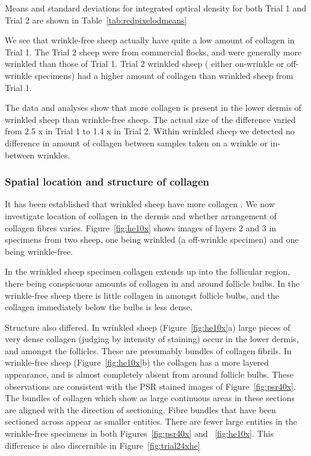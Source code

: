 \documentclass[]{interact}
\theoremstyle{plain}%
\theoremstyle{definition}
\theoremstyle{remark}
\begin{document}
Means and standard deviations for integrated optical density for both Trial 1 and Trial 2 are shown in Table~\ref{tab:redpixelodmeans}

We see that wrinkle-free sheep actually have quite a low amount of collagen in Trial 1. 
The Trial 2 sheep were from commercial flocks, and were generally more wrinkled than those of Trial 1.  Trial 2  wrinkled sheep ( either on-wrinkle or  off-wrinkle specimens) had a higher amount of collagen than wrinkled sheep from Trial 1. 

The data and analyses show that more collagen is present in the lower dermis of wrinkled sheep than wrinkle-free sheep.  The actual size of the difference varied from 2.5 x in Trial 1 to 1.4 x in Trial 2. 
Within wrinkled sheep we detected no difference in amount of collagen between samples taken on a wrinkle or in-between wrinkles.


\subsubsection{Spatial location and structure of collagen}
It has been established that wrinkled sheep have more collagen . We now investigate location of collagen in the dermis and whether arrangement of collagen fibres varies.
Figure~\ref{fig:he10x} shows images of layers 2 and 3 in specimens from two sheep, one being wrinkled (a off-wrinkle specimen) and one being wrinkle-free.

In the wrinkled sheep specimen collagen extends up into the follicular region, there being conspicuous amounts of collagen in and around follicle bulbs. In the wrinkle-free sheep there is little collagen in amongst follicle bulbs, and the collagen immediately below the bulbs is less dense.

Structure also differed. In wrinkled sheep  (Figure~\ref{fig:he10x}a) large pieces of very dense collagen (judging by intensity of staining) occur  in the lower dermis, and amongst the follicles. These are presumably bundles of collagen fibrils. In wrinkle-free sheep (Figure~\ref{fig:he10x}b) the collagen has a more layered appearance, and is almost completely absent from around follicle bulbs.
 These observations are consistent with the PSR stained images of Figure~\ref{fig:psr40x}. The bundles of collagen which show as large continuous areas in these sections are aligned with the direction of sectioning. Fibre bundles that have been sectioned across appear as smaller entities. There are fewer large entities in the wrinkle-free specimens in both Figures~\ref{fig:psr40x} and ~\ref{fig:he10x}. This difference is also discernible in Figure~\ref{fig:trial24xhe}
\end{document}
